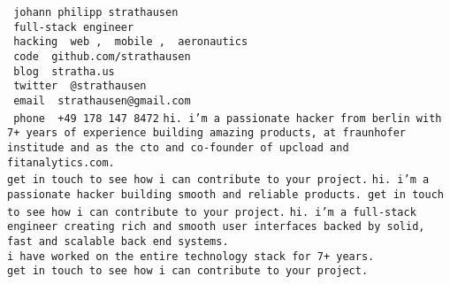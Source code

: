 \documentclass[a5paper,landscape]{article}
\newcommand{\blue}[1]{\texttt{\color{Green} #1}}
\newcommand{\red}[1]{\texttt{\color{WildStrawberry} #1}}
\begin{document}
\noindent
\Huge
\red{johann philipp strathausen} \\
\blue{full-stack engineer} \\
\blue{hacking }\red{web}\blue{, }\red{mobile}\blue{, }\red{aeronautics} \\
\red{code }\blue{github.com/strathausen} \\
\red{blog }\blue{stratha.us} \\
\red{twitter }\blue{@strathausen} \\
\red{email }\blue{strathausen@gmail.com} \\
\red{phone }\blue{+49 178 147 8472}
\clearpage
\pagecolor{MidnightBlue}
\color{White}
\noindent
\texttt{hi.
  i'm a passionate hacker from berlin with
  7+ years of experience building amazing products,
  at fraunhofer institude and
  as the cto and co-founder of upcload and
  fitanalytics.com. \\
  get in touch to see how i can contribute to your project.}
\newpage
\noindent
\texttt{hi. i'm a passionate hacker building smooth and reliable products.
  get in touch to see how i can contribute to your project.}
\newpage
\noindent
\texttt{hi. i'm a full-stack engineer creating rich
  and smooth
  user interfaces backed by solid, fast and scalable back end
  systems.\\
  i have worked on the entire technology stack for 7+ years.\\
  get in touch to see how i can contribute to your project.}
\end{document}
